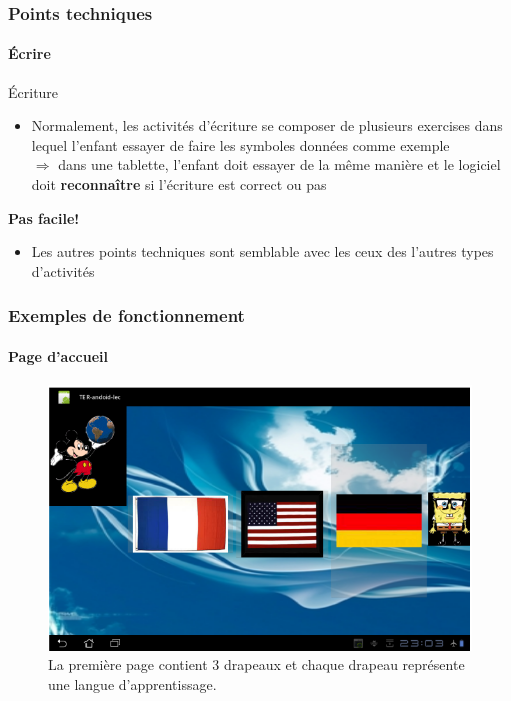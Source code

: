 \documentclass[15pt]{beamer}
\begin{document}
\begin{frame}
 \frametitle{Points techniques}
  \framesubtitle{\'Ecrire}

\begin{alertblock}{\'Ecriture}
\begin{itemize}
\item Normalement, les activit\'es d'\'ecriture se composer de plusieurs exercises dans lequel l'enfant
  essayer de faire les symboles donn\'ees comme exemple \\
$\Rightarrow$ dans une tablette, l'enfant doit essayer de la m\^eme mani\`ere et le logiciel doit \textbf{reconna\^itre}
si l'\'ecriture est correct ou pas
\end{itemize}
\begin{center}
 {\color{red} \textbf{Pas facile!}}
\end{center}
\end{alertblock}

\begin{itemize}
\item Les autres points techniques sont semblable avec les ceux des l'autres types d'activit\'es
\end{itemize}
\end{frame}


\begin{frame}
 \frametitle{Exemples de fonctionnement}
  \framesubtitle{Page d'accueil}
\begin{figure}[tr]
  \centering
  \includegraphics[scale=0.50]{./home.png}
  \caption{La premi\`ere page contient 3 drapeaux et chaque drapeau représente une langue d'apprentissage.}
  \label{fig:figure1}
\end{figure}
\end{frame}
\end{document}
